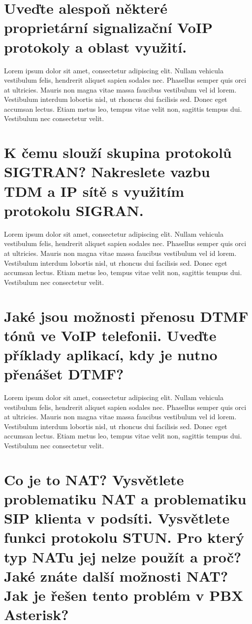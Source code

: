 \section{Uveďte alespoň některé proprietární signalizační VoIP protokoly a oblast využití.}

Lorem ipsum dolor sit amet, consectetur adipiscing elit. Nullam vehicula vestibulum felis, hendrerit aliquet sapien sodales nec. Phasellus semper quis orci at ultricies. Mauris non magna vitae massa faucibus vestibulum vel id lorem. Vestibulum interdum lobortis nisl, ut rhoncus dui facilisis sed. Donec eget accumsan lectus. Etiam metus leo, tempus vitae velit non, sagittis tempus dui. Vestibulum nec consectetur velit.

\section{K čemu slouží skupina protokolů SIGTRAN? Nakreslete vazbu TDM a IP sítě s využitím protokolu SIGRAN.}

Lorem ipsum dolor sit amet, consectetur adipiscing elit. Nullam vehicula vestibulum felis, hendrerit aliquet sapien sodales nec. Phasellus semper quis orci at ultricies. Mauris non magna vitae massa faucibus vestibulum vel id lorem. Vestibulum interdum lobortis nisl, ut rhoncus dui facilisis sed. Donec eget accumsan lectus. Etiam metus leo, tempus vitae velit non, sagittis tempus dui. Vestibulum nec consectetur velit.

\section{Jaké jsou možnosti přenosu DTMF tónů ve VoIP telefonii. Uveďte příklady aplikací, kdy je nutno přenášet DTMF?}

Lorem ipsum dolor sit amet, consectetur adipiscing elit. Nullam vehicula vestibulum felis, hendrerit aliquet sapien sodales nec. Phasellus semper quis orci at ultricies. Mauris non magna vitae massa faucibus vestibulum vel id lorem. Vestibulum interdum lobortis nisl, ut rhoncus dui facilisis sed. Donec eget accumsan lectus. Etiam metus leo, tempus vitae velit non, sagittis tempus dui. Vestibulum nec consectetur velit.

\section{Co je to NAT? Vysvětlete problematiku NAT a problematiku SIP klienta v podsíti. Vysvětlete funkci protokolu STUN. Pro který typ NATu jej nelze použít a proč? Jaké znáte další možnosti  NAT? Jak je řešen tento problém v PBX Asterisk?}


